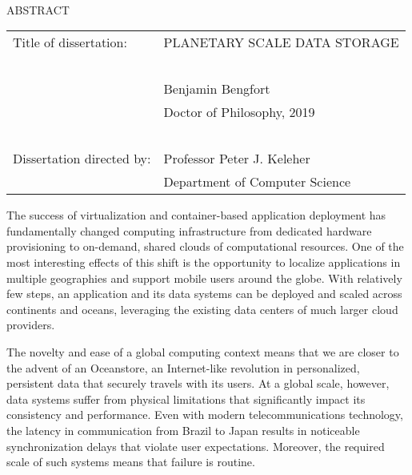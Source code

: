 
\hbox{\ }

\renewcommand{\baselinestretch}{1}
\small \normalsize

\begin{center}
\large{{ABSTRACT}}

\vspace{3em}

\end{center}
\hspace{-.15in}
\begin{tabular}{ll}
Title of dissertation:    & {\large  PLANETARY SCALE DATA STORAGE }\\
\ \\
&                          {\large  Benjamin Bengfort} \\
&                           {\large Doctor of Philosophy, 2019} \\
\ \\
Dissertation directed by: & {\large  Professor Peter J. Keleher} \\
&               {\large  Department of Computer Science } \\
\end{tabular}

\vspace{3em}

\renewcommand{\baselinestretch}{2}
\large \normalsize

The success of virtualization and container-based application deployment has fundamentally changed computing infrastructure from dedicated hardware provisioning to on-demand, shared clouds of computational resources. One of the most interesting effects of this shift is the opportunity to localize applications in multiple geographies and support mobile users around the globe. With relatively few steps, an application and its data systems can be deployed and scaled across continents and oceans, leveraging the existing data centers of much larger cloud providers.

The novelty and ease of a global computing context means that we are closer to the advent of an Oceanstore, an Internet-like revolution in personalized, persistent data that securely travels with its users. At a global scale, however, data systems suffer from physical limitations that significantly impact its consistency and performance. Even with modern telecommunications technology, the latency in communication from Brazil to Japan results in noticeable synchronization delays that violate user expectations. Moreover, the required scale of such systems means that failure is routine.

